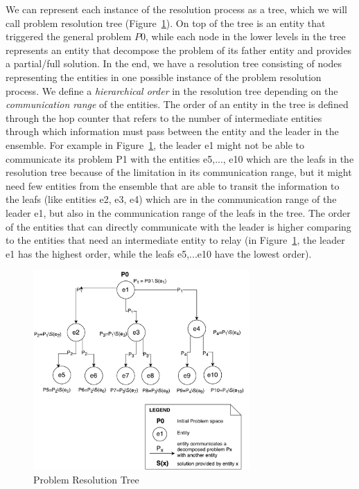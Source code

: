 \documentclass[journal]{IEEEtran}
\theoremstyle{definition}
\begin{document}
We can represent each instance of the resolution process as a tree, which we will call problem resolution tree (Figure~\ref{fig:MissionTree}). On top of the tree is an entity that triggered the general problem $P0$, while each node in the lower levels in the tree represents an entity that decompose the problem of its father entity and provides a partial/full solution. In the end, we have a resolution tree consisting of nodes representing the entities in one possible instance of the problem resolution process. We define a \textit{hierarchical order} in the resolution tree depending on the \textit{communication range} of the entities. The order of an entity in the tree  
is defined through the hop counter that refers to the number of intermediate entities through which information must pass between the entity and the leader in the ensemble. For example in Figure~\ref{fig:MissionTree}, the leader e1 might not be able to communicate its problem P1 with the entities e5,..., e10 which are the leafs in the resolution tree because of the limitation in its communication range, but it might need few entities from the ensemble that are able to transit the information to the leafs (like entities e2, e3, e4) which are in the communication range of the leader e1, but also in the communication range of the leafs in the tree. The order of the entities that can directly communicate with the leader is higher comparing to the entities that need an intermediate entity to relay (in Figure~\ref{fig:MissionTree}, the leader e1 has the highest order, while the leafs e5,...e10 have the lowest order).

\begin{figure}[h]
\includegraphics[width=3.25in]{Figures/ResolutionTree_FN.pdf}
\caption{Problem Resolution Tree}\label{fig:MissionTree}
\end{figure}
\end{document}
